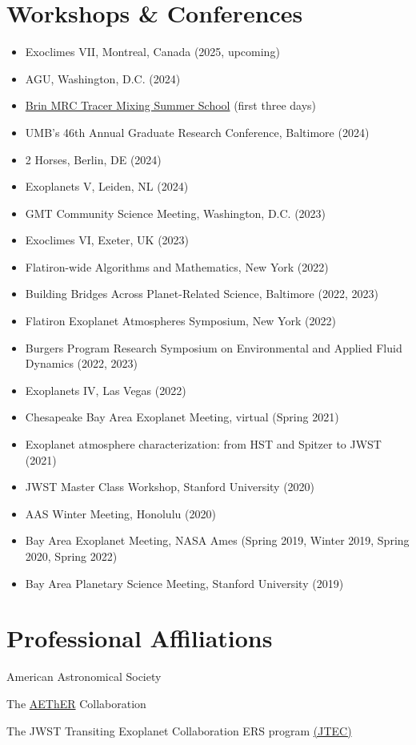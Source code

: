 \documentclass[letterpaper,10.5pt]{article}
\newcommand{\resumeItem}[2]{
  \item\small{
    \textbf{#1}{#2 \vspace{-2pt}}
  }
}
\newcommand{\resumeSubHeadingListStart}{\begin{itemize}[leftmargin=*]}
\newcommand{\resumeItemListStart}{\begin{itemize}}
\newcommand{\resumeItemListEnd}{\end{itemize}\vspace{-5pt}}
\newcommand{\shorterSection}[1]{\vspace{-10pt}\section{#1}}
\begin{document}
\shorterSection{Workshops \& Conferences}
\resumeItemListStart
\resumeItem{}{Exoclimes VII, Montreal, Canada (2025, upcoming)}
\resumeItem{}{AGU, Washington, D.C. (2024)}
\resumeItem{}{\href{https://brinmrc.umd.edu/programs/schools/summer24/summer24-school-mixing.html}{Brin MRC Tracer Mixing Summer School} (first three days)}
\resumeItem{}{UMB's 46th Annual Graduate Research Conference, Baltimore (2024)}
\resumeItem{}{2 Horses, Berlin, DE (2024)}
\resumeItem{}{Exoplanets V, Leiden, NL (2024)}
\resumeItem{}{GMT Community Science Meeting, Washington, D.C. (2023)}
\resumeItem{}{Exoclimes VI, Exeter, UK (2023)}
\resumeItem{}{Flatiron-wide Algorithms and Mathematics, New York (2022)}
\resumeItem{}{Building Bridges Across Planet-Related Science, Baltimore (2022, 2023)}
\resumeItem{}{Flatiron Exoplanet Atmospheres Symposium, New York (2022)}
\resumeItem{}{Burgers Program Research
Symposium on Environmental and Applied Fluid Dynamics (2022, 2023)}
\resumeItem{}{Exoplanets IV, Las Vegas (2022)}
\resumeItem{}{Chesapeake Bay Area Exoplanet Meeting, virtual (Spring 2021)}
\resumeItem{}{Exoplanet atmosphere characterization: from HST and Spitzer to JWST (2021)}
\resumeItem{}{JWST Master Class Workshop, Stanford University (2020)}
\resumeItem{}{AAS Winter Meeting, Honolulu (2020)}
\resumeItem{}{Bay Area Exoplanet Meeting, NASA Ames (Spring 2019, Winter 2019, Spring 2020, Spring 2022)}
\resumeItem{}{Bay Area Planetary Science Meeting, Stanford University (2019)}
\resumeItemListEnd

\shorterSection{Professional Affiliations}
\small
  \begin{list}{}{\cvlist}
  \item[{\color{numcolor}}]American Astronomical Society
  \item[{\color{numcolor}}]The \href{https://planets.carnegiescience.edu/}{AEThER} Collaboration
  \item[{\color{numcolor}}]The JWST Transiting Exoplanet Collaboration ERS program \href{https://ers-transit.github.io/}{(JTEC)}



  \end{list}
\end{document}
